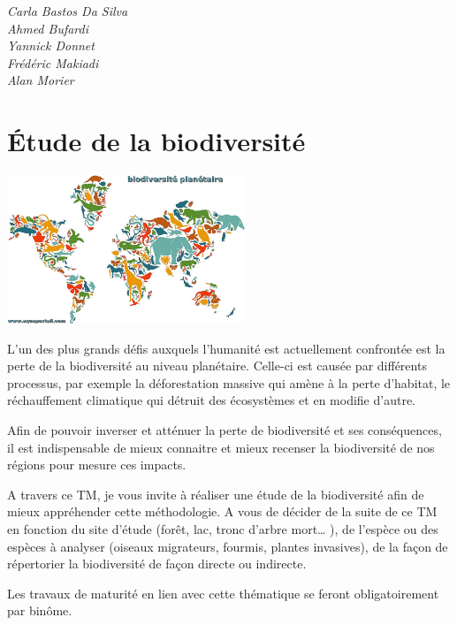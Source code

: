 \documentclass[
  10pt,
  french,
  a5paper,
  openany]{book}
\newenvironment{signature}{\begin{flushright}}{\end{flushright}}
\begin{document}
\begin{signature}
\emph{Carla Bastos Da Silva}\\
\emph{Ahmed Bufardi}\\
\emph{Yannick Donnet}\\
\emph{Frédéric Makiadi}\\
\emph{Alan Morier}

\end{signature}

\hypertarget{uxe9tude-de-la-biodiversituxe9}{%
\chapter{Étude de la biodiversité}\label{uxe9tude-de-la-biodiversituxe9}}

\begin{center}
\includegraphics[width=\textwidth,height=12em]{images/etude-de-la-biodiversite.jpg}

\end{center}

L'un des plus grands défis auxquels l'humanité est actuellement confrontée est la perte de la biodiversité au niveau planétaire. Celle-ci est causée par différents processus, par exemple la déforestation massive qui amène à la perte d'habitat, le réchauffement climatique qui détruit des écosystèmes et en modifie d'autre.

Afin de pouvoir inverser et atténuer la perte de biodiversité et ses conséquences, il est indispensable de mieux connaitre et mieux recenser la biodiversité de nos régions pour mesure ces impacts.

A travers ce TM, je vous invite à réaliser une étude de la biodiversité afin de mieux appréhender cette méthodologie. A vous de décider de la suite de ce TM en fonction du site d'étude (forêt, lac, tronc d'arbre mort\ldots{} ), de l'espèce ou des espèces à analyser (oiseaux migrateurs, fourmis, plantes invasives), de la façon de répertorier la biodiversité de façon directe ou indirecte.

Les travaux de maturité en lien avec cette thématique se feront obligatoirement par binôme.
\end{document}
